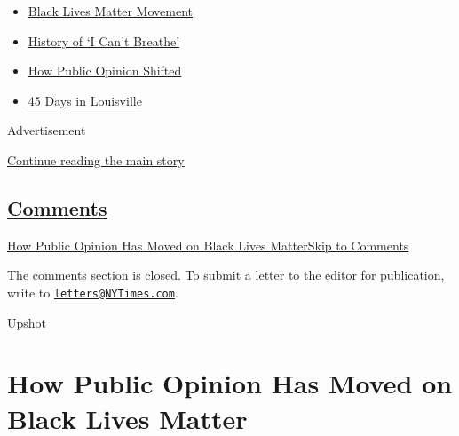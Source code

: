\begin{itemize}
\tightlist
\item
  \href{https://www.nytimes3xbfgragh.onion/interactive/2020/07/03/us/george-floyd-protests-crowd-size.html?name=styln-george-floyd\&region=TOP_BANNER\&variant=undefined\&block=storyline_menu_recirc\&action=click\&pgtype=Interactive\&impression_id=5e073411-e3a9-11ea-87d2-81bdd276209e}{Black
  Lives Matter Movement}
\item
  \href{https://www.nytimes3xbfgragh.onion/interactive/2020/06/28/us/i-cant-breathe-police-arrest.html?name=styln-george-floyd\&region=TOP_BANNER\&variant=undefined\&block=storyline_menu_recirc\&action=click\&pgtype=Interactive\&impression_id=5e073412-e3a9-11ea-87d2-81bdd276209e}{History
  of `I Can't Breathe'}
\item
  \href{https://www.nytimes3xbfgragh.onion/interactive/2020/06/10/upshot/black-lives-matter-attitudes.html?name=styln-george-floyd\&region=TOP_BANNER\&variant=undefined\&block=storyline_menu_recirc\&action=click\&pgtype=Interactive\&impression_id=5e073413-e3a9-11ea-87d2-81bdd276209e}{How
  Public Opinion Shifted}
\item
  \href{https://www.nytimes3xbfgragh.onion/interactive/2020/07/16/us/black-lives-matter-protests-louisville-breonna-taylor.html?name=styln-george-floyd\&region=TOP_BANNER\&variant=undefined\&block=storyline_menu_recirc\&action=click\&pgtype=Interactive\&impression_id=5e073414-e3a9-11ea-87d2-81bdd276209e}{45
  Days in Louisville}
\end{itemize}

Advertisement

\protect\hyperlink{after-top}{Continue reading the main story}

\hypertarget{comments}{%
\subsection{\texorpdfstring{\protect\hyperlink{commentsContainer}{Comments}}{Comments}}\label{comments}}

\href{}{How Public Opinion Has Moved on Black Lives Matter}\href{}{Skip
to Comments}

The comments section is closed. To submit a letter to the editor for
publication, write to
\href{mailto:letters@NYTimes.com}{\nolinkurl{letters@NYTimes.com}}.

Upshot

\hypertarget{how-public-opinion-has-moved-on-black-lives-matter}{%
\section{How Public Opinion Has Moved on Black Lives
Matter}\label{how-public-opinion-has-moved-on-black-lives-matter}}

